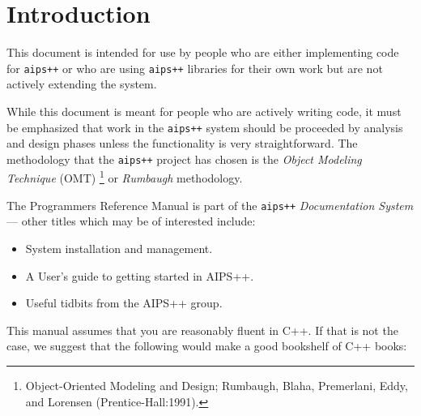 \chapter{Introduction}\label{Programming:Intro}

This document is intended for use by people who are either implementing
code for {\tt aips++} or who are using {\tt aips++} libraries for their
own work but are not actively extending the system.  

\label{Intro:Rumbaugh Methodology}
\label{Intro:OMT --- Object Modeling Technique}

While this document is meant for people who are actively writing code,
it must be emphasized that work in the {\tt aips++} system should be
proceeded by analysis and design phases unless the functionality is very
straightforward. The methodology that the {\tt aips++} project has chosen
is the {\em Object Modeling Technique} (OMT) \footnote{Object-Oriented
Modeling and Design; Rumbaugh, Blaha, Premerlani, Eddy, and Lorensen
(Prentice-Hall:1991).} or {\em Rumbaugh} methodology.

\label{Intro:aips2documentation}
The Programmers Reference Manual is part of the {\tt aips++} {\em Documentation System} ---
other titles which may be of interested include:

\begin{itemize}
\item {}
System  installation and management.
\item {}
A User's guide to getting started in AIPS++.
\item {}
Useful tidbits from the AIPS++ group.
\end{itemize}

This manual assumes that you are reasonably fluent in C++. If that is
not the case, we suggest that the following would make a good bookshelf
of C++ books:

